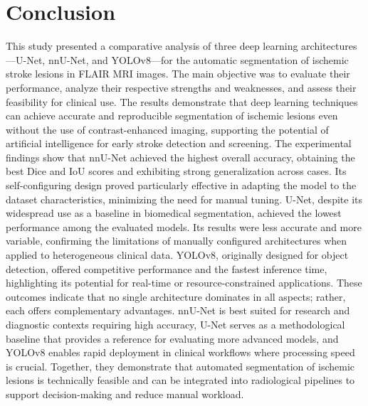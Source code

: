 \documentclass[12pt]{article}
\begin{document}
\section{Conclusion}\label{sec:conclusion}


This study presented a comparative analysis of three deep learning architectures—U-Net, nnU-Net, and YOLOv8—for the automatic segmentation of ischemic stroke lesions in FLAIR MRI images. The main objective was to evaluate their performance, analyze their respective strengths and weaknesses, and assess their feasibility for clinical use. The results demonstrate that deep learning techniques can achieve accurate and reproducible segmentation of ischemic lesions even without the use of contrast-enhanced imaging, supporting the potential of artificial intelligence for early stroke detection and screening.
%
The experimental findings show that nnU-Net achieved the highest overall accuracy, obtaining the best Dice and IoU scores and exhibiting strong generalization across cases. Its self-configuring design proved particularly effective in adapting the model to the dataset characteristics, minimizing the need for manual tuning. U-Net, despite its widespread use as a baseline in biomedical segmentation, achieved the lowest performance among the evaluated models. Its results were less accurate and more variable, confirming the limitations of manually configured architectures when applied to heterogeneous clinical data. YOLOv8, originally designed for object detection, offered competitive performance and the fastest inference time, highlighting its potential for real-time or resource-constrained applications.
%
These outcomes indicate that no single architecture dominates in all aspects; rather, each offers complementary advantages. nnU-Net is best suited for research and diagnostic contexts requiring high accuracy, U-Net serves as a methodological baseline that provides a reference for evaluating more advanced models, and YOLOv8 enables rapid deployment in clinical workflows where processing speed is crucial. Together, they demonstrate that automated segmentation of ischemic lesions is technically feasible and can be integrated into radiological pipelines to support decision-making and reduce manual workload.
\end{document}

